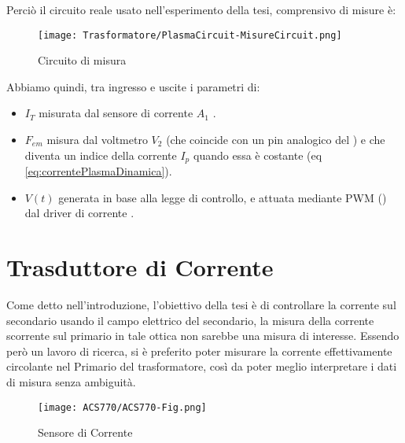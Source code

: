 \newpage
Perciò il circuito reale usato nell'esperimento della tesi, comprensivo di misure è:\\
\begin{figure}[h] \label{fig:circuitoDiMisura}
	\centering
	\caption[Circuito reale di misura dell'esperimento]{Circuito di misura}
	\texttt{[image: Trasformatore/PlasmaCircuit-MisureCircuit.png]}
\end{figure}

Abbiamo quindi, tra ingresso e uscite i parametri di:
\begin{itemize}
	\item $I_T$ misurata dal sensore di corrente $ A_1 $ .
	\item $F_{em}$ misura dal voltmetro $V_2$ (che coincide con un pin analogico del \microControllore) e che diventa un indice della corrente $I_p$ quando essa è costante (eq \ref{eq:correntePlasmaDinamica}).
	\item $V(t)$ generata in base alla legge di controllo, e attuata mediante PWM (\cite{modulazionePWM}) dal driver di corrente .
\end{itemize}


\newpage


\section{Trasduttore di Corrente}\label{CurrentSense}
Come detto nell'introduzione, l'obiettivo della tesi è di controllare la corrente sul secondario usando il campo elettrico del secondario, la misura della corrente scorrente sul primario in tale ottica non sarebbe una misura di interesse. Essendo però un lavoro di ricerca, si è preferito poter misurare la corrente effettivamente circolante nel Primario del trasformatore, così da poter meglio interpretare i dati di misura senza ambiguità.\\
\begin{figure}[h]
	\centering
	\caption[Sensore di Corrente ]{Sensore di Corrente}
	\texttt{[image: ACS770/ACS770-Fig.png]}
\end{figure}
